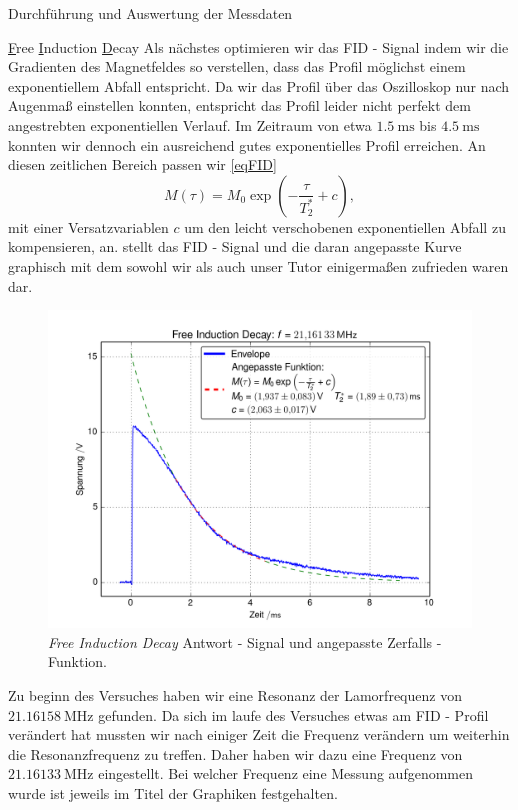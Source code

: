 \documentclass[pdftex, a4paper,11pt, twoside, ngerman]{report}
\begin{document}
\begin{chapter}{Durchführung und Auswertung der Messdaten}
    \begin{section}{
        \underline{F}ree \underline{I}nduction \underline{D}ecay}
      \label{chpFID}
      Als nächstes optimieren wir das FID - Signal indem wir die Gradienten
      des Magnetfeldes so verstellen, dass das Profil möglichst einem
      exponentiellem Abfall entspricht.
      Da wir das Profil über das Oszilloskop nur nach Augenmaß einstellen
      konnten, entspricht das Profil leider nicht perfekt dem angestrebten
      exponentiellen Verlauf.
      Im Zeitraum von etwa $\SI{1.5}{\milli\second}$ bis
      $\SI{4.5}{\milli\second}$ konnten wir dennoch ein ausreichend
      gutes exponentielles Profil erreichen.
      An diesen zeitlichen Bereich passen wir \cref{eqFID}
      \begin{equation}
        \label{eqFID}
        M(\tau)=M_{0}\exp{\left(-\frac{\tau}{T_{2}^{*}}+c\right)},
      \end{equation}
      mit einer Versatzvariablen $c$ um den leicht verschobenen exponentiellen
      Abfall zu kompensieren, an.
       stellt das FID - Signal und die daran angepasste Kurve
      graphisch mit dem sowohl wir als auch unser Tutor einigermaßen zufrieden
      waren dar.
      \begin{figure}[htb]
        \centering
        \includegraphics[width=.7\textwidth]{Figures/FID_env2.png}
        \caption{\textit{Free Induction Decay} Antwort - Signal und angepasste
          Zerfalls - Funktion.}
        \label{figFIDenv}
      \end{figure}
      
      Zu beginn des Versuches haben wir eine Resonanz der Lamorfrequenz von
      $\SI{21.16158}{\mega\hertz}$ gefunden.
      Da sich im laufe des Versuches etwas am FID - Profil verändert hat
      mussten wir nach einiger Zeit die Frequenz verändern um weiterhin die
      Resonanzfrequenz zu treffen.
      Daher haben wir dazu eine Frequenz von $\SI{21.16133}{\mega\hertz}$
      eingestellt.
      Bei welcher Frequenz eine Messung aufgenommen wurde ist jeweils im Titel
      der Graphiken festgehalten.
      

\end{section}
\end{chapter}
\end{document}

